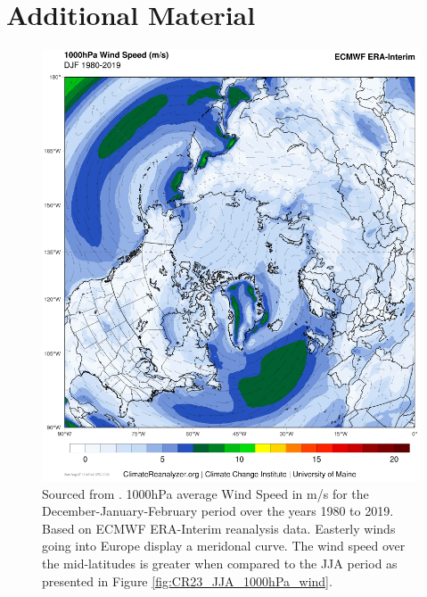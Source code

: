 \chapter{Additional Material}
    \begin{figure}
        \centering
        \includegraphics[width=\textwidth]{figures/erai_59.png}
        \caption{Sourced from \cite{ClimateReanalyzer2023}. 1000hPa average Wind Speed in m/s for the December-January-February period over the years 1980 to 2019. Based on ECMWF ERA-Interim reanalysis data. Easterly winds going into Europe display a meridonal curve. The wind speed over the mid-latitudes is greater when compared to the JJA period as presented in Figure \ref{fig:CR23_JJA_1000hPa_wind}.}
        \label{fig:CR23_DJF_1000hPa_wind}
    \end{figure}

